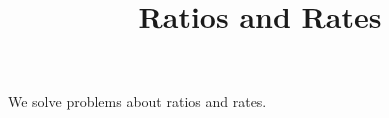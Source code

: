\documentclass{ximera}
\title{Ratios and Rates}
\begin{document}
\begin{abstract}
\end{abstract}
\maketitle

We solve problems about ratios and rates.
\end{document}
